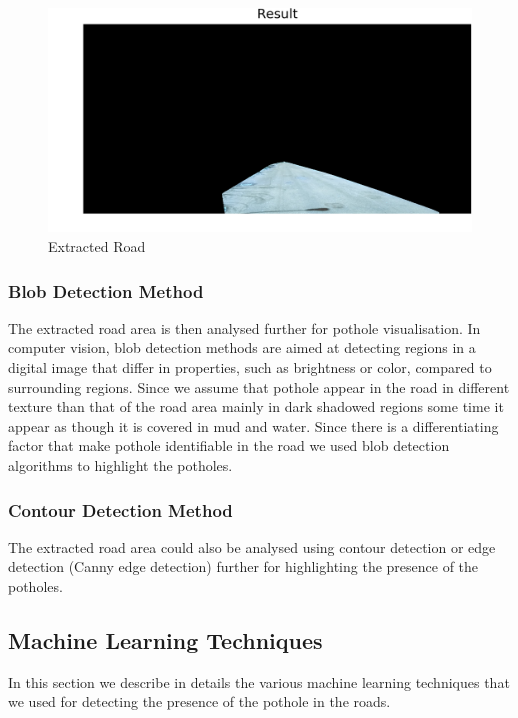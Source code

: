 \documentclass[journal]{IEEEtran}
\begin{document}
\begin{figure}[!htb]
\begin{center}
\includegraphics[scale=0.65]{Images/7_Result.png}
\end{center}
\caption{Extracted Road}
\end{figure}

\newpage

\subsubsection{Blob Detection Method}

The extracted road area is then analysed further for pothole visualisation. In computer vision, blob detection methods are aimed at detecting regions in a digital image that differ in properties, such as brightness or color, compared to surrounding regions. Since we assume that pothole appear in the road in different texture than that of the road area mainly in dark shadowed regions some time it appear as though it is covered in mud and water. Since there is a differentiating factor that make pothole identifiable in the road we used blob detection algorithms to highlight the potholes.

\subsubsection{Contour Detection Method}
The extracted road area could also be analysed using contour detection or edge detection (Canny edge detection) further for highlighting the presence of the potholes.

\subsection{Machine Learning Techniques}

In this section we describe in details the various machine learning techniques that we used for detecting the presence of the pothole in the roads.
\end{document}
